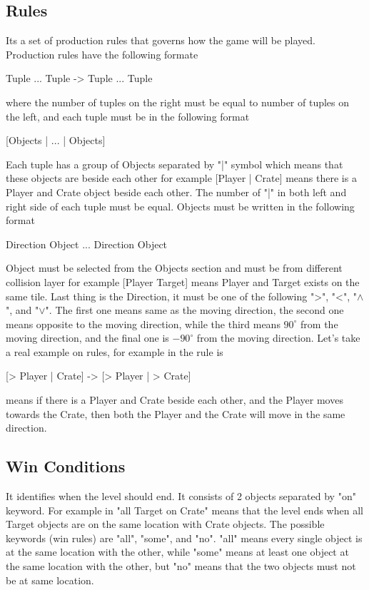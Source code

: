 \subsection{Rules}
Its a set of production rules that governs how the game will be played. Production rules have the following formate
\begin{center}{Tuple ... Tuple -> Tuple ... Tuple}\end{center}
where the number of tuples on the right must be equal to number of tuples on the left, and each tuple must be in the following format
\begin{center}{[Objects | ... | Objects]}\end{center}
Each tuple has a group of Objects separated by "|" symbol which means that these objects are beside each other for example [Player | Crate] means there is a Player and Crate object beside each other. The number of "|" in both left and right side of each tuple must be equal. Objects must be written in the following format
\begin{center}{Direction Object ... Direction Object}\end{center}
Object must be selected from the Objects section and must be from different collision layer for example [Player Target] means Player and Target exists on the same tile. Last thing is the Direction, it must be one of the following ">", "<", "$\wedge$", and "$\vee$". The first one means same as the moving direction, the second one means opposite to the moving direction, while the third means $90^{\circ}$ from the moving direction, and the final one is $-90^{\circ}$ from the moving direction. Let's take a real example on rules, for example in  the rule is
\begin{center}{[> Player | Crate] -> [> Player | > Crate]}\end{center}
means if there is a Player and Crate beside each other, and the Player moves towards the Crate, then both the Player and the Crate will move in the same direction.

\subsection{Win Conditions} 
It identifies when the level should end. It consists of 2 objects separated by "on" keyword. For example in  "all Target on Crate" means that the level ends when all Target objects are on the same location with Crate objects. The possible keywords (win rules) are "all", "some", and "no". "all" means every single object is at the same location with the other, while "some" means at least one object at the same location with the other, but "no" means that the two objects must not be at same location.

